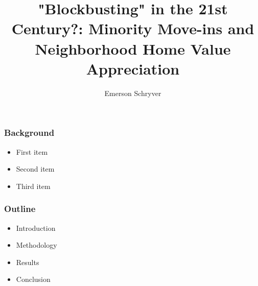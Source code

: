 \documentclass{beamer}
\title[Minority Move-Ins and Home Appreciation]{"Blockbusting" in the 21st Century?: Minority Move-ins and Neighborhood Home Value Appreciation}
\author{Emerson Schryver}
\begin{document}
\begin{frame}
    \maketitle
\end{frame}
\begin{frame}
\frametitle{Background}
\begin{itemize}
    \item First item
    \item Second item
    \item Third item
\end{itemize}
\end{frame}
\begin{frame}
\frametitle{Outline}
\begin{itemize}
    \item Introduction
    \item Methodology
    \item Results
    \item Conclusion
\end{itemize}
\end{frame}
\end{document}
